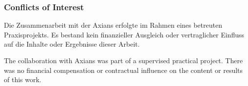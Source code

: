 \subsubsection{Conflicts of Interest}
\begin{German}
    Die Zusammenarbeit mit der Axians erfolgte im Rahmen eines betreuten Praxisprojekts. Es bestand kein finanzieller Ausgleich oder vertraglicher Einfluss auf die Inhalte oder Ergebnisse dieser Arbeit.
\end{German}

\begin{English}
    The collaboration with Axians was part of a supervised practical project. There was no financial compensation or contractual influence on the content or results of this work.
\end{English}